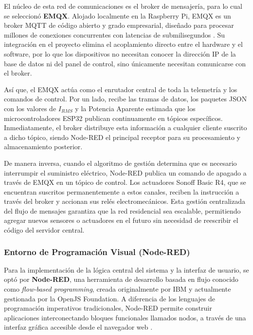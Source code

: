             El núcleo de esta red de comunicaciones es el broker de mensajería, para lo cual se seleccionó \textbf{EMQX}. Alojado localmente en la Raspberry Pi, EMQX es un broker MQTT de código abierto y grado empresarial, diseñado para procesar millones de conexiones concurrentes con latencias de submilisegundos \cite{emqx2026doc}. Su integración en el proyecto elimina el acoplamiento directo entre el hardware y el software, por lo que los dispositivos no necesitan conocer la dirección IP de la base de datos ni del panel de control, sino únicamente necesitan comunicarse con el broker.


            Así que, el EMQX actúa como el enrutador central de toda la telemetría y los comandos de control. Por un lado, recibe las tramas de datos, los paquetes JSON con los valores de $I_{RMS}$ y la Potencia Aparente estimada que los microcontroladores ESP32 publican continuamente en tópicos específicos. Inmediatamente, el broker distribuye esta información a cualquier cliente suscrito a dicho tópico, siendo Node-RED el principal receptor para su procesamiento y almacenamiento posterior.

            De manera inversa, cuando el algoritmo de gestión determina que es necesario interrumpir el suministro eléctrico, Node-RED publica un comando de apagado a través de EMQX en un tópico de control. Los actuadores Sonoff Basic R4, que se encuentran suscritos permanentemente a estos canales, reciben la instrucción a través del broker y accionan sus relés electromecánicos. Esta gestión centralizada del flujo de mensajes garantiza que la red residencial sea escalable, permitiendo agregar nuevos sensores o actuadores en el futuro sin necesidad de reescribir el código del servidor central.

        \subsubsection{Entorno de Programación Visual (Node-RED)}

            Para la implementación de la lógica central del sistema y la interfaz de usuario, se optó por \textbf{Node-RED}, una herramienta de desarrollo basada en flujo conocido como \textit{flow-based programming}, creada originalmente por IBM y actualmente gestionada por la OpenJS Foundation. A diferencia de los lenguajes de programación imperativos tradicionales, Node-RED permite construir aplicaciones interconectando bloques funcionales llamados nodos, a través de una interfaz gráfica accesible desde el navegador web \cite{nodered2026doc}.

